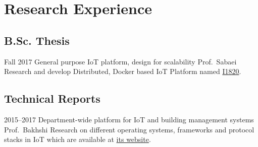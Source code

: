 \section{Research Experience}

\subsection{B.Sc. Thesis}

\cventry%
  {Fall 2017}
  {General purpose IoT platform, design for scalability}
  {}
  {Prof.\ Sabaei}
  {}{%
    Research and develop Distributed, Docker based IoT Platform named \href{https://github.com/I1820}{I1820}.
  }

\subsection{Technical Reports}

\cventry%
  {2015--2017}
  {Department-wide platform for IoT and building management systems}
  {}
  {Prof.\ Bakhshi}
  {}{%
    Research on different operating systems, frameworks and protocol stacks in IoT which are available at \href{https://aolab.github.io/}{its website}.
  }